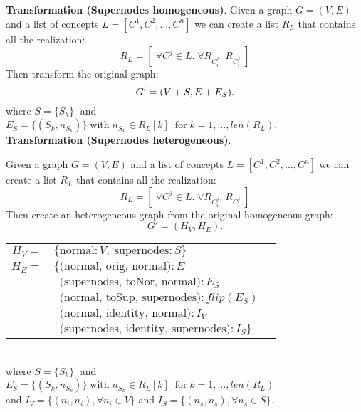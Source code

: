 \documentclass[twoside,11pt]{article}
\begin{document}
\noindent
{\bf Transformation (Supernodes homogeneous)}.
{
    Given a graph \( G = (V,E) \) and a list of concepts \( L = [C^1, C^2, \ldots, C^n] \) we can create a list \( R_{L} \) that contains all the realization:
\[
    R_L = [ \; \forall C^j \in L.\;\forall R_{C_i^j}. \; R_{C_i^j} \; ]
\]
Then transform the original graph: \[
    G'=(V+S, E+E_S)  \\
.\]where \( S = \{S_{k} \} \; \) and \( E_S = \{ (S_k, n_{S_k})  \} \; \textrm{with} \; n_{S_k} \in R_L[k] \;\; \textrm{for} \; k = 1, \ldots, len(R_L) \).
}\\

\noindent
{\bf Transformation (Supernodes heterogeneous)}.
{
    Given a graph \( G = (V,E) \) and a list of concepts \( L = [C^1, C^2, \ldots, C^n] \) we can create a list \( R_{L} \) that contains all the realization:
\[
    R_L = [ \; \forall C^j \in L.\;\forall R_{C_i^j}. \; R_{C_i^j} \; ]
\]
Then create an heterogeneous graph from the original homogeneous graph:\[
    G'=(H_V, H_E)
.\]
\begin{tabular}{cll}
    \( H_V = \) &  \( \{\textrm{normal}:V,\; \textrm{supernodes}:S\} \) \\
    \( H_E = \) &  \( \{\textrm{(normal, orig, normal)} : E \) \\
              & \( \,\,\, \textrm{(supernodes, toNor, normal)} : E_S \) \\
              & \( \,\,\, \textrm{(normal, toSup, supernodes)} : flip(E_S) \) \\
              & \( \,\,\, \textrm{(normal, identity, normal)} : I_V \) \\
              & \( \,\,\, \textrm{(supernodes, identity, supernodes)} : I_S \}\) \\
\end{tabular}\\

\noindent
where \( S = \{S_{k} \} \; \) and \( E_S = \{ (S_k, n_{S_k})  \} \; \textrm{with} \; n_{S_k} \in R_L[k] \;\; \textrm{for} \; k = 1, \ldots, len(R_L) \) \\
and \( I_V = \{(n_i, n_i), \forall n_i \in V\} \) and \( I_S = \{(n_s, n_s), \forall n_s \in S \} \).
}\\
\end{document}
